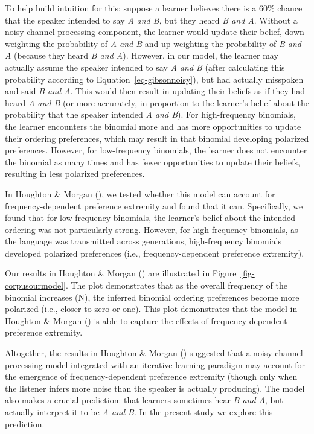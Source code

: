 \documentclass[
  12pt,
]{scrartcl}
\begin{document}
To help build intuition for this: suppose a learner believes there is a
60\% chance that the speaker intended to say \emph{A and B}, but they
heard \emph{B and A}. Without a noisy-channel processing component, the
learner would update their belief, down-weighting the probability of
\emph{A and B} and up-weighting the probability of \emph{B and A}
(because they heard \emph{B and A}). However, in our model, the learner
may actually assume the speaker intended to say \emph{A and B} (after
calculating this probability according to
Equation~\ref{eq-gibsonnoisy}), but had actually misspoken and said
\emph{B and A}. This would then result in updating their beliefs as if
they had heard \emph{A and B} (or more accurately, in proportion to the
learner's belief about the probability that the speaker intended \emph{A
and B}). For high-frequency binomials, the learner encounters the
binomial more and has more opportunities to update their ordering
preferences, which may result in that binomial developing polarized
preferences. However, for low-frequency binomials, the learner does not
encounter the binomial as many times and has fewer opportunities to
update their beliefs, resulting in less polarized preferences.

In Houghton \& Morgan
(),
we tested whether this model can account for frequency-dependent
preference extremity and found that it can. Specifically, we found that
for low-frequency binomials, the learner's belief about the intended
ordering was not particularly strong. However, for high-frequency
binomials, as the language was transmitted across generations,
high-frequency binomials developed polarized preferences (i.e.,
frequency-dependent preference extremity).

Our results in Houghton \& Morgan
()
are illustrated in Figure~\ref{fig-corpusourmodel}. The plot
demonstrates that as the overall frequency of the binomial increases
(N), the inferred binomial ordering preferences become more polarized
(i.e., closer to zero or one). This plot demonstrates that the model in
Houghton \& Morgan
()
is able to capture the effects of frequency-dependent preference
extremity.

Altogether, the results in Houghton \& Morgan
()
suggested that a noisy-channel processing model integrated with an
iterative learning paradigm may account for the emergence of
frequency-dependent preference extremity (though only when the listener
infers more noise than the speaker is actually producing). The model
also makes a crucial prediction: that learners sometimes hear \emph{B
and A}, but actually interpret it to be \emph{A and B}. In the present
study we explore this prediction.
\end{document}
